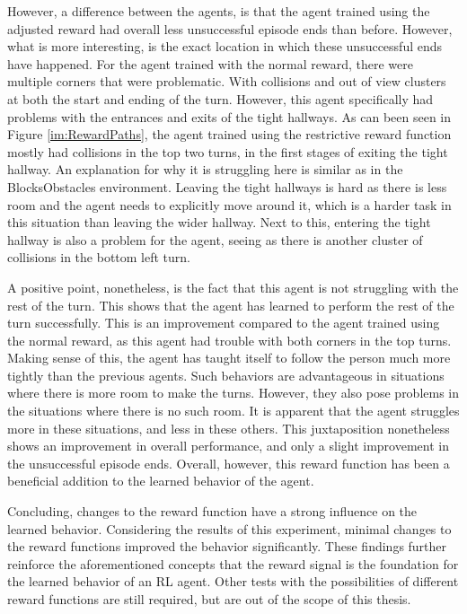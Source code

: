 However, a difference between the agents, is that the agent trained using 
the adjusted reward had overall less unsuccessful episode ends than before. However, 
what is more interesting, is the exact location in which these unsuccessful ends 
have happened. For the agent trained with the normal reward, there were multiple 
corners that were problematic. With collisions and out of view clusters at both 
the start and ending of the turn. However, this agent specifically had problems with 
the entrances and exits of the tight hallways. As can been seen in Figure \ref{im:RewardPaths}, 
the agent trained using the restrictive reward function mostly had collisions 
in the top two turns, in the first stages of exiting the tight hallway. An explanation 
for why it is struggling here is similar as in the BlocksObstacles environment. 
Leaving the tight hallways is hard as there is less room and the agent needs to 
explicitly move around it, which is a harder task in this situation than leaving the wider 
hallway. Next to this, entering the tight hallway is also a problem for the agent, seeing 
as there is another cluster of collisions in the bottom left turn. 

A positive point, nonetheless, is the fact that this agent is not struggling with the rest 
of the turn. This shows that the agent has learned to perform the rest of the turn successfully.
This is an improvement compared to the agent trained using the normal reward, as this agent 
had trouble with both corners in the top turns. Making sense of this, the agent has taught 
itself to follow the person much more tightly than the previous agents. Such behaviors 
are advantageous in situations where there is more room to make the turns. However, 
they also pose problems in the situations where there is no such room. It is apparent that 
the agent struggles more in these situations, and less in these others. This juxtaposition 
nonetheless shows an improvement in overall performance, and only a slight improvement in the
unsuccessful episode ends. Overall, however, this reward function has been a beneficial 
addition to the learned behavior of the agent. 

Concluding, changes to the reward function have a strong influence on the learned behavior. 
Considering the results of this experiment, minimal changes to the reward functions improved 
the behavior significantly. These findings further reinforce the aforementioned concepts that 
the reward signal is the foundation for the learned behavior of an RL agent. Other 
tests with the possibilities of different reward functions are still required, but are 
out of the scope of this thesis. 









